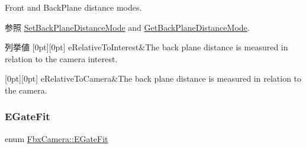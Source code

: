 Front and Back\+Plane distance modes. \begin{DoxySeeAlso}{参照}
\hyperlink{class_fbx_camera_a47cacdb816666eebadb56febbc3fa406}{Set\+Back\+Plane\+Distance\+Mode} and \hyperlink{class_fbx_camera_a862928086a5ae50086651ce6b96aa8c0}{Get\+Back\+Plane\+Distance\+Mode}. 
\end{DoxySeeAlso}
\begin{DoxyEnumFields}{列挙値}
[0pt][0pt]{}\mbox{\label{class_fbx_camera_a79e74898d117e741c3fbd10b1ef21c79ad53d9e2ed112ce41f81d62da18788135}} 
e\+Relative\+To\+Interest&The back plane distance is measured in relation to the camera interest. \\
\hline

[0pt][0pt]{}\mbox{\label{class_fbx_camera_a79e74898d117e741c3fbd10b1ef21c79a98897f48447c5d2ac67a64fe7dfdd3a3}} 
e\+Relative\+To\+Camera&The back plane distance is measured in relation to the camera. \\
\hline

\end{DoxyEnumFields}
\mbox{\label{class_fbx_camera_aeef0bf29c16fe5f08815fb33402330dd}} 
\subsubsection{\texorpdfstring{E\+Gate\+Fit}{EGateFit}}
{\footnotesize\ttfamily enum \hyperlink{class_fbx_camera_aeef0bf29c16fe5f08815fb33402330dd}{Fbx\+Camera\+::\+E\+Gate\+Fit}}

